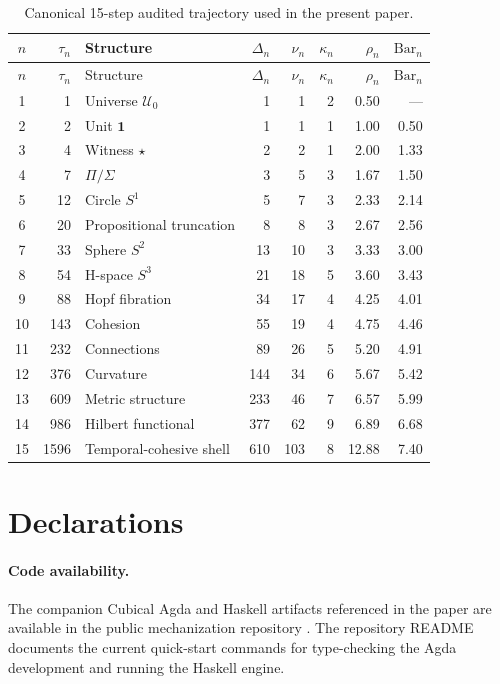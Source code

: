 \documentclass[11pt]{article}
\theoremstyle{plain}
\theoremstyle{definition}
\theoremstyle{remark}
\newcommand{\U}{\mathcal{U}}
\newcommand{\SelBar}{\mathrm{Bar}}
\begin{document}
\begin{longtable}{@{}crlrrrrr@{}}
\caption{Canonical 15-step audited trajectory used in the present paper.}
\label{tab:full-trajectory}\\
\toprule
$n$ & $\tau_n$ & Structure & $\Delta_n$ & $\nu_n$ & $\kappa_n$ & $\rho_n$ & $\SelBar_n$ \\
\midrule
\endfirsthead
\toprule
$n$ & $\tau_n$ & Structure & $\Delta_n$ & $\nu_n$ & $\kappa_n$ & $\rho_n$ & $\SelBar_n$ \\
\midrule
\endhead
1 & 1 & Universe $\U_0$ & 1 & 1 & 2 & 0.50 & --- \\
2 & 2 & Unit $\mathbf 1$ & 1 & 1 & 1 & 1.00 & 0.50 \\
3 & 4 & Witness $\star$ & 2 & 2 & 1 & 2.00 & 1.33 \\
4 & 7 & $\Pi/\Sigma$ & 3 & 5 & 3 & 1.67 & 1.50 \\
5 & 12 & Circle $S^1$ & 5 & 7 & 3 & 2.33 & 2.14 \\
6 & 20 & Propositional truncation & 8 & 8 & 3 & 2.67 & 2.56 \\
7 & 33 & Sphere $S^2$ & 13 & 10 & 3 & 3.33 & 3.00 \\
8 & 54 & H-space $S^3$ & 21 & 18 & 5 & 3.60 & 3.43 \\
9 & 88 & Hopf fibration & 34 & 17 & 4 & 4.25 & 4.01 \\
10 & 143 & Cohesion & 55 & 19 & 4 & 4.75 & 4.46 \\
11 & 232 & Connections & 89 & 26 & 5 & 5.20 & 4.91 \\
12 & 376 & Curvature & 144 & 34 & 6 & 5.67 & 5.42 \\
13 & 609 & Metric structure & 233 & 46 & 7 & 6.57 & 5.99 \\
14 & 986 & Hilbert functional & 377 & 62 & 9 & 6.89 & 6.68 \\
15 & 1596 & Temporal-cohesive shell & 610 & 103 & 8 & 12.88 & 7.40 \\
\bottomrule
\end{longtable}

\section*{Declarations}

\paragraph{Code availability.}
The companion Cubical Agda and Haskell artifacts referenced in the paper are available in the public mechanization repository \citep{lande-repo}. The repository README documents the current quick-start commands for type-checking the Agda development and running the Haskell engine.
\end{document}

